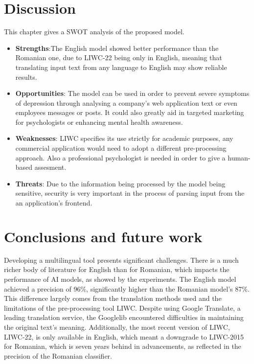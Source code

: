 \documentclass[3p,times,procedia]{elsarticle}
\begin{document}
\section{Discussion}\label{discussion}
This chapter gives a SWOT analysis of the proposed model.
\begin{itemize}

\item{\textbf{Strengths}:The English model showed better performance than the Romanian one, due to LIWC-22 being only in English, meaning that translating input text from any language to English may show reliable results.}

\item{\textbf{Opportunities}: The model can be used in order to prevent severe symptoms of depression through analysing a company's web application text or even employees messages or posts. It could also greatly aid in targeted marketing for psychologists or enhancing mental health awareness.}

\item{\textbf{Weaknesses}: LIWC \cite{boyd2022development} specifies its use strictly for academic purposes, any commercial application would need to adopt a different pre-processing approach. Also a professional psychologist is needed in order to give a human-based assesment.}

\item{\textbf{Threats}: Due to the information being processed by the model being sensitive, security is very important in the process of parsing input from the an application's frontend.}
     
\end{itemize}
\section{Conclusions and future work}\label{conclusions}

\quad Developing a multilingual tool presents significant challenges. There is a much richer body of literature for English than for Romanian, which impacts the performance of AI models, as showed by the experiments. The English model achieved a precision of 96\%, significantly higher than the Romanian model's 87\%. This difference largely comes from the translation methods used and the limitations of the pre-processing tool LIWC. Despite using Google Translate, a leading translation service, the Googlelib \cite{googletranslib} encountered difficulties in maintaining the original text's meaning. Additionally, the most recent version of LIWC, LIWC-22, is only available in English, which meant a downgrade to LIWC-2015 for Romanian, which is seven years behind in advancements, as reflected in the precision of the Romanian classifier.
\end{document}
